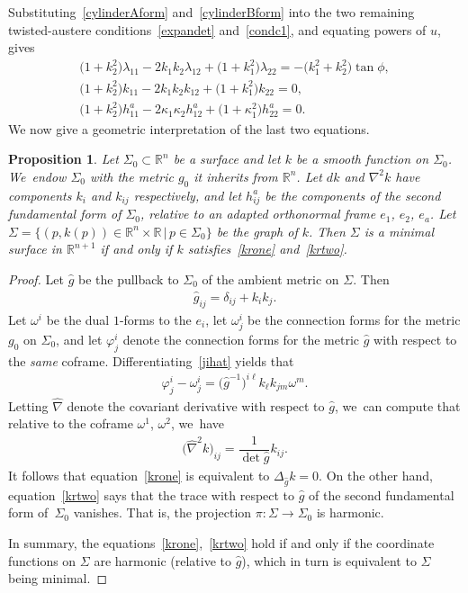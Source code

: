 \documentclass[10pt,a4paper]{amsart}
\def\R{\mathbb{R}}
\def\w{\omega}
\def\ghat{\widehat{g}}
\def\hatnabla{\widehat{\nabla}}
\newtheorem{Proposition}[Theorem]{Proposition}
\numberwithin{equation}{section}
\begin{document}
Substituting~\eqref{cylinderAform} and~\eqref{cylinderBform} into the two remaining twisted-austere conditions~\eqref{expandet} and~\eqref{condc1}, and equating powers of $u$, gives
\begin{gather}
\big(1 +k_2^2\big) \lambda_{11} - 2k_1k_2 \lambda_{12} + \big(1 + k_1^2\big) \lambda_{22} = -\big(k_1^2 +k_2^2\big) \tan \phi, \label{krell}
\\
\big(1+k_2^2\big) k_{11} - 2k_1 k_2 k_{12} + \big(1+k_1^2\big) k_{22} =0,
\label{krone}
\\
\big(1+k_2^2\big) h^a_{11} - 2\kappa_1\kappa_2 h^a_{12} + \big(1 + \kappa_1^2\big) h^a_{22} = 0.
\label{krtwo}
\end{gather}
We now give a geometric interpretation of the last two equations.

\begin{Proposition}
Let $\Sigma_0 \subset \R^n$ be a surface and let $k$ be a smooth function on $\Sigma_0$. We~endow $\Sigma_0$ with the metric $g_0$ it inherits from $\R^{n}$. Let $dk$ and $\nabla^2 k$ have components $k_i$ and $k_{ij}$ respectively, and let $h^a_{ij}$ be the components of the second fundamental form of $\Sigma_0$, relative to an adapted orthonormal frame $e_1$, $e_2$, $e_a$. Let $\Sigma = \big\{ (p, k(p)) \in \R^n \times \R \,|\, p \in \Sigma_0 \big\}$ be the graph of $k$. Then $\Sigma$ is a minimal surface in $\R^{n+1}$ if and only if $k$ satisfies~\eqref{krone} and~\eqref{krtwo}.
\end{Proposition}
\begin{proof} Let $\ghat$ be the pullback to $\Sigma_0$ of the ambient metric on $\Sigma$. Then
\begin{gather} \label{jihat}
\ghat_{ij} = \delta_{ij} + k_i k_j.\end{gather}
Let $\w^i$ be the dual $1$-forms to the $e_i$, let $\w^i_j$ be the connection forms for the metric $g_0$ on $\Sigma_0$, and let $\varphi^i_j$ denote the connection forms for the metric $\ghat$ with respect to the \emph{same} coframe. Differentiating~\eqref{jihat} yields that
\begin{gather} \label{changeconn}
\varphi^i_j - \w^i_j = \big(\ghat^{-1}\big)^{i\ell } k_\ell k_{jm} \w^m.
\end{gather}
Letting $\hatnabla$ denote the covariant derivative with respect to $\ghat$, we~can compute that relative to the coframe $\w^1$, $\w^2$, we~have
\begin{gather*}
\big(\hatnabla^2 k\big)_{ij} =\dfrac{1}{\det\ghat}k_{ij}.
\end{gather*}
It follows that equation~\eqref{krone} is equivalent to $\Delta_{\ghat} k = 0$. On the other hand, equation~\eqref{krtwo} says that the trace with respect to $\ghat$ of the second fundamental form of~$\Sigma_0$ vanishes. That is, the projection $\pi\colon \Sigma \to \Sigma_0$ is harmonic.

In summary, the equations~\eqref{krone},~\eqref{krtwo} hold if and only if the coordinate functions on $\Sigma$ are harmonic (relative to $\ghat$),
which in turn is equivalent to $\Sigma$ being minimal.
\end{proof}
\end{document}
